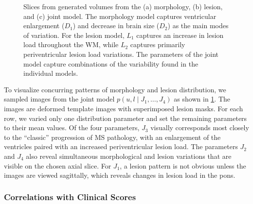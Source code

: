 \begin{figure}[tb]
{
} \caption[Slices from generated volumes from the morphology, lesion,
and joint model]{Slices from generated volumes from the (a) morphology, (b)
lesion, and (c) joint model. The morphology model captures ventricular
enlargement ($D_1$) and decrease in brain size ($D_2$) as the main modes of
variation. For the lesion model, $L_1$ captures an increase in lesion load
throughout the WM, while $L_2$ captures primarily periventricular lesion load
variations. The parameters of the joint model capture combinations
of the variability found in the individual models.}
\label{fig:samples}
\end{figure}

To visualize concurring patterns of morphology and lesion distribution, we
sampled images from the joint model $p(u, l \mid J_1, \dotsc, J_4)$ as shown in
\ref{fig:samples}. The images are deformed template images
with superimposed lesion masks. For each row, we varied only one distribution
parameter and set the remaining parameters to their mean values. Of the four
parameters, $J_3$ visually corresponds most closely to the ``classic''
progression of MS pathology, with an enlargement of the ventricles paired with
an increased periventricular lesion load. The parameters $J_2$ and $J_4$ also
reveal simultaneous morphological and lesion variations that are visible on the
chosen axial slice. For $J_1$, a lesion pattern is not obvious unless the images
are viewed sagittally, which reveals changes in lesion load in the pons.

\subsubsection{Correlations with Clinical Scores}


